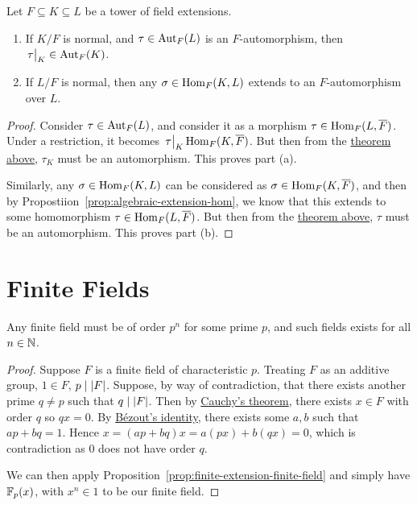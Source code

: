 \begin{proposition}
    Let \(F \subseteq K \subseteq L\) be a tower of field extensions.
    \begin{enumerate}[label={(\alph*)}, itemsep=0mm]
        \item If \(K/F\) is normal, and \(\tau \in \operatorname{Aut}_F(L)\) is an \(F\)-automorphism,
            then \(\eval{\tau}_K \in \Aut_F(K)\).
        \item If \(L/F\) is normal, then any \(\sigma \in \operatorname{Hom}_F(K,L)\)
            extends to an \(F\)-automorphism over \(L\).
    \end{enumerate}
\end{proposition}
\begin{proof}
    Consider \(\tau \in \operatorname{Aut}_F(L)\), and consider it as a morphism \(\tau \in \operatorname{Hom}_F(L,\overline{F})\).
    Under a restriction, it becomes \(\eval{\tau}_K \Hom_F(K,\overline{F})\).
    But then from the \hyperref[thm:normal-extension-equivalence]{theorem above},
    \(\tau_K\) must be an automorphism.
    This proves part (a).

    Similarly, any \(\sigma \in \operatorname{Hom}_F(K,L)\) can be considered as \(\sigma \in \operatorname{Hom}_F(K,\overline{F})\),
    and then by Propostiion~\ref{prop:algebraic-extension-hom},
    we know that this extends to some homomorphism \(\tau \in \operatorname{Hom}_F(L,\overline{F})\).
    But then from the \hyperref[thm:normal-extension-equivalence]{theorem above},
    \(\tau\) must be an automorphism.
    This proves part (b).
\end{proof}


\section{Finite Fields}

\begin{proposition}\label{prop:existence-finite-fields}
    Any finite field must be of order \(p^n\) for some prime \(p\),
    and such fields exists for all \(n \in \mathbb{N}\).
\end{proposition}
\begin{proof}
    Suppose \(F\) is a finite field of characteristic \(p\).
    Treating \(F\) as an additive group, \(1 \in F\), \(p \mid \abs{F}\).
    Suppose, by way of contradiction,
    that there exists another prime \(q \neq p\) such that \(q \mid \abs{F}\).
    Then by \hyperref[thm:cayley]{Cauchy's theorem},
    there exists \(x \in F\) with order \(q\) so \(qx = 0\).
    By \hyperref[thm:bezout]{B\'ezout's identity},
    there exists some \(a,b\) such that \(ap + bq = 1\).
    Hence \(x = (ap+bq)x = a(px) + b(qx) = 0\),
    which is contradiction as \(0\) does not have order \(q\).

    We can then apply Proposition~\ref{prop:finite-extension-finite-field}
    and simply have \(\mathbb{F}_p(x)\), with \(x^n \in 1\) to be our finite field.
\end{proof}


